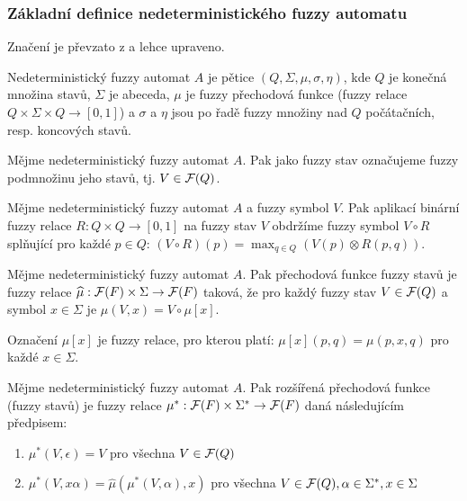 \documentclass[a4paper,10pt]{article}
\begin{document}
\subsubsection*{Základní definice nedeterministického fuzzy automatu}
Značení je převzato z \cite{AstGonMenGar-FuzzAutEpsMovCmpFuzzMeasBtwStrs} a lehce upraveno.

\begin{definition}\label{def-ZaklDefNedFuzzAut}
 Nedeterministický fuzzy automat $A$ je pětice $(Q, \Sigma, \mu, \sigma, \eta)$, kde $Q$ je konečná množina stavů, $\Sigma$ je abeceda, $\mu$ je fuzzy přechodová funkce (fuzzy relace $Q \times \Sigma \times Q \rightarrow [0, 1]$) a $\sigma$ a $\eta$ jsou po řadě fuzzy množiny nad $Q$ počátačních, resp. koncových stavů.
\end{definition}

\begin{definition}\label{def-FuzzStav}
 Mějme nedeterministický fuzzy automat $A$. Pak jako fuzzy stav označujeme fuzzy podmnožinu jeho stavů, tj. $V \in \mathcal{F}(Q)$.
\end{definition}

\begin{definition}
 Mějme nedeterministický fuzzy automat $A$ a fuzzy symbol $V$. Pak aplikací binární fuzzy relace $R: Q \times Q \rightarrow [0, 1]$ na fuzzy stav $V$ obdržíme fuzzy symbol $V \circ R$ splňující pro každé $p \in Q$: $(V \circ R )(p) = \max_{q \in Q} (V(p) \otimes R(p, q))$.
\end{definition}

\begin{definition}\label{def-PreFunFuzzStav}
 Mějme nedeterministický fuzzy automat $A$. Pak přechodová funkce fuzzy stavů je fuzzy relace $\widehat{\mu}: \mathcal{F}(F) \times \Sigma \rightarrow \mathcal{F}(F)$ taková, že pro každý fuzzy stav $V \in \mathcal{F}(Q)$ a symbol $x \in \Sigma$ je $\widehat{\mu}(V, x) = V \circ \mu[x]$.
\end{definition}

\begin{note}
 Označení $\mu[x]$ je fuzzy relace, pro kterou platí: $\mu[x](p, q) = \mu(p, x, q)$ pro každé $x \in \Sigma$.
\end{note}

\begin{definition}\label{def-PreFunFuzzStav}
 Mějme nedeterministický fuzzy automat $A$. Pak rozšířená přechodová funkce (fuzzy stavů) je fuzzy relace $\mu^*: \mathcal{F}(F) \times \Sigma^* \rightarrow \mathcal{F}(F)$ daná následujícím předpisem:
 \begin{enumerate}
  \item $\mu^*(V, \epsilon) = V$ pro všechna $V \in \mathcal{F}(Q)$
  \item $\mu^*(V, x \alpha) = \widehat{\mu}(\mu^*(V, \alpha), x)$ pro všechna $V \in \mathcal{F}(Q), \alpha \in \Sigma^*, x \in \Sigma$
 \end{enumerate}
\end{definition}
\end{document}
